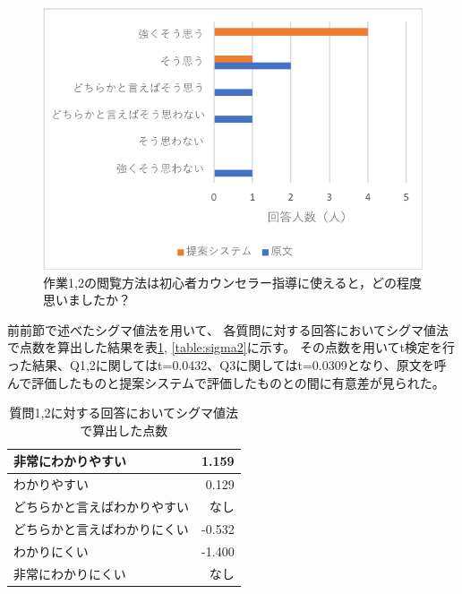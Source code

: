 \documentclass[shuuron]{kuee}
\begin{document}
\begin{figure}
  \begin{center}
     \includegraphics[width=\linewidth]{q3.png}
  \end{center}
  \caption{作業1,2の閲覧方法は初心者カウンセラー指導に使えると，どの程度思いましたか？}
  \label{fig:q3}
\end{figure}

前前節で述べたシグマ値法を用いて、
各質問に対する回答においてシグマ値法で点数を算出した結果を表\ref{table:sigma}, \ref{table:sigma2}に示す。
その点数を用いてt検定を行った結果、Q1,2に関してはt=0.0432、Q3に関してはt=0.0309となり、原文を呼んで評価したものと提案システムで評価したものとの間に有意差が見られた。

\begin{table}
  \caption{質問1,2に対する回答においてシグマ値法で算出した点数}
  \label{table:sigma}
  \begin{center}
    \begin{tabular}{|l|r|} \hline
      非常にわかりやすい & 1.159 \\ \hline
      わかりやすい  & 0.129 \\ \hline
      どちらかと言えばわかりやすい & なし \\ \hline
      どちらかと言えばわかりにくい & -0.532 \\ \hline
      わかりにくい  & -1.400 \\ \hline
      非常にわかりにくい & なし \\ \hline
    \end{tabular}
  \end{center}
\end{table}
\end{document}
